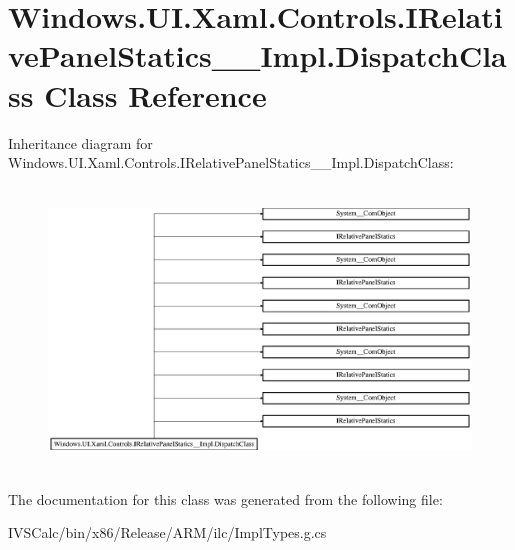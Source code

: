 \hypertarget{class_windows_1_1_u_i_1_1_xaml_1_1_controls_1_1_i_relative_panel_statics_____impl_1_1_dispatch_class}{}\section{Windows.\+U\+I.\+Xaml.\+Controls.\+I\+Relative\+Panel\+Statics\+\_\+\+\_\+\+Impl.\+Dispatch\+Class Class Reference}
\label{class_windows_1_1_u_i_1_1_xaml_1_1_controls_1_1_i_relative_panel_statics_____impl_1_1_dispatch_class}
Inheritance diagram for Windows.\+U\+I.\+Xaml.\+Controls.\+I\+Relative\+Panel\+Statics\+\_\+\+\_\+\+Impl.\+Dispatch\+Class\+:\begin{figure}[H]
\begin{center}
\leavevmode
\includegraphics[height=7.530562cm]{class_windows_1_1_u_i_1_1_xaml_1_1_controls_1_1_i_relative_panel_statics_____impl_1_1_dispatch_class}
\end{center}
\end{figure}


The documentation for this class was generated from the following file\+:\begin{DoxyCompactItemize}
\item 
I\+V\+S\+Calc/bin/x86/\+Release/\+A\+R\+M/ilc/Impl\+Types.\+g.\+cs\end{DoxyCompactItemize}
